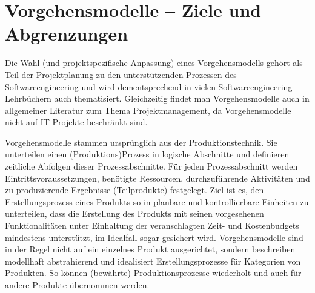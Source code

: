 \section{Vorgehensmodelle – Ziele und Abgrenzungen}
\label{sec:Kap-2.1}

Die Wahl (und projektspezifische Anpassung) eines Vorgehensmodells gehört als Teil der Projektplanung zu den unterstützenden Prozessen des Softwareengineering und wird dementsprechend in vielen Softwareengineering-Lehrbüchern auch thematisiert. Gleichzeitig findet man Vorgehensmodelle auch in allgemeiner Literatur zum Thema Projektmanagement, da Vorgehensmodelle nicht auf IT-Projekte beschränkt sind.

Vorgehensmodelle stammen ursprünglich aus der Produktionstechnik. Sie unterteilen einen (Produktions)Prozess in logische Abschnitte und definieren zeitliche Abfolgen dieser Prozessabschnitte. Für jeden Prozessabschnitt werden Eintrittsvoraussetzungen, benötigte Ressourcen, durchzuführende Aktivitäten und zu produzierende Ergebnisse (Teilprodukte) festgelegt. Ziel ist es, den Erstellungsprozess eines Produkts so in planbare und kontrollierbare Einheiten zu unterteilen, dass die Erstellung des Produkts mit seinen vorgesehenen Funktionalitäten unter Einhaltung der veranschlagten Zeit- und Kostenbudgets mindestens unterstützt, im Idealfall sogar gesichert wird. Vorgehensmodelle sind in der Regel nicht auf ein einzelnes Produkt ausgerichtet, sondern beschreiben modellhaft abstrahierend und idealisiert Erstellungsprozesse für Kategorien von Produkten. So können (bewährte) Produktionsprozesse wiederholt und auch für andere Produkte übernommen werden.


